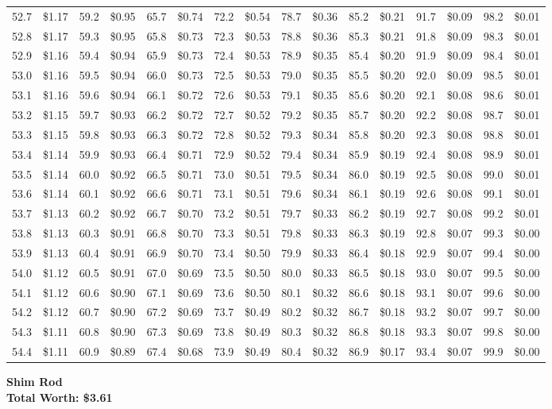 \documentclass{article}
\begin{document}
\begin{tabular}{|*{8}{rr|}}
52.7 & \$1.17 & 59.2 & \$0.95 & 65.7 & \$0.74 & 72.2 & \$0.54 & 78.7 & \$0.36 & 85.2 & \$0.21 & 91.7 & \$0.09 & 98.2 & \$0.01\\
52.8 & \$1.17 & 59.3 & \$0.95 & 65.8 & \$0.73 & 72.3 & \$0.53 & 78.8 & \$0.36 & 85.3 & \$0.21 & 91.8 & \$0.09 & 98.3 & \$0.01\\
52.9 & \$1.16 & 59.4 & \$0.94 & 65.9 & \$0.73 & 72.4 & \$0.53 & 78.9 & \$0.35 & 85.4 & \$0.20 & 91.9 & \$0.09 & 98.4 & \$0.01\\
53.0 & \$1.16 & 59.5 & \$0.94 & 66.0 & \$0.73 & 72.5 & \$0.53 & 79.0 & \$0.35 & 85.5 & \$0.20 & 92.0 & \$0.09 & 98.5 & \$0.01\\
53.1 & \$1.16 & 59.6 & \$0.94 & 66.1 & \$0.72 & 72.6 & \$0.53 & 79.1 & \$0.35 & 85.6 & \$0.20 & 92.1 & \$0.08 & 98.6 & \$0.01\\
53.2 & \$1.15 & 59.7 & \$0.93 & 66.2 & \$0.72 & 72.7 & \$0.52 & 79.2 & \$0.35 & 85.7 & \$0.20 & 92.2 & \$0.08 & 98.7 & \$0.01\\
53.3 & \$1.15 & 59.8 & \$0.93 & 66.3 & \$0.72 & 72.8 & \$0.52 & 79.3 & \$0.34 & 85.8 & \$0.20 & 92.3 & \$0.08 & 98.8 & \$0.01\\
53.4 & \$1.14 & 59.9 & \$0.93 & 66.4 & \$0.71 & 72.9 & \$0.52 & 79.4 & \$0.34 & 85.9 & \$0.19 & 92.4 & \$0.08 & 98.9 & \$0.01\\
53.5 & \$1.14 & 60.0 & \$0.92 & 66.5 & \$0.71 & 73.0 & \$0.51 & 79.5 & \$0.34 & 86.0 & \$0.19 & 92.5 & \$0.08 & 99.0 & \$0.01\\
53.6 & \$1.14 & 60.1 & \$0.92 & 66.6 & \$0.71 & 73.1 & \$0.51 & 79.6 & \$0.34 & 86.1 & \$0.19 & 92.6 & \$0.08 & 99.1 & \$0.01\\
53.7 & \$1.13 & 60.2 & \$0.92 & 66.7 & \$0.70 & 73.2 & \$0.51 & 79.7 & \$0.33 & 86.2 & \$0.19 & 92.7 & \$0.08 & 99.2 & \$0.01\\
53.8 & \$1.13 & 60.3 & \$0.91 & 66.8 & \$0.70 & 73.3 & \$0.51 & 79.8 & \$0.33 & 86.3 & \$0.19 & 92.8 & \$0.07 & 99.3 & \$0.00\\
53.9 & \$1.13 & 60.4 & \$0.91 & 66.9 & \$0.70 & 73.4 & \$0.50 & 79.9 & \$0.33 & 86.4 & \$0.18 & 92.9 & \$0.07 & 99.4 & \$0.00\\
54.0 & \$1.12 & 60.5 & \$0.91 & 67.0 & \$0.69 & 73.5 & \$0.50 & 80.0 & \$0.33 & 86.5 & \$0.18 & 93.0 & \$0.07 & 99.5 & \$0.00\\
54.1 & \$1.12 & 60.6 & \$0.90 & 67.1 & \$0.69 & 73.6 & \$0.50 & 80.1 & \$0.32 & 86.6 & \$0.18 & 93.1 & \$0.07 & 99.6 & \$0.00\\
54.2 & \$1.12 & 60.7 & \$0.90 & 67.2 & \$0.69 & 73.7 & \$0.49 & 80.2 & \$0.32 & 86.7 & \$0.18 & 93.2 & \$0.07 & 99.7 & \$0.00\\
54.3 & \$1.11 & 60.8 & \$0.90 & 67.3 & \$0.69 & 73.8 & \$0.49 & 80.3 & \$0.32 & 86.8 & \$0.18 & 93.3 & \$0.07 & 99.8 & \$0.00\\
54.4 & \$1.11 & 60.9 & \$0.89 & 67.4 & \$0.68 & 73.9 & \$0.49 & 80.4 & \$0.32 & 86.9 & \$0.17 & 93.4 & \$0.07 & 99.9 & \$0.00\\

\end{tabular}
\clearpage
{\large\bf Shim Rod\\Total Worth: \$3.61}
\end{document}
